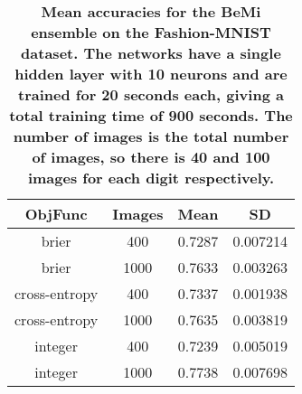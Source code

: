 \begin{center}
\begin{table}[!tb]
\centering
\begin{tabular}{|c|c|c|c|}
  \hline
ObjFunc & Images & Mean & SD \\ 
  \hline
brier & 400 & 0.7287 & 0.007214 \\ 
   \hline
brier & 1000 & 0.7633 & 0.003263 \\ 
   \hline
cross-entropy & 400 & 0.7337 & 0.001938 \\ 
   \hline
cross-entropy & 1000 & 0.7635 & 0.003819 \\ 
   \hline
integer & 400 & 0.7239 & 0.005019 \\ 
   \hline
integer & 1000 & 0.7738 & 0.007698 \\ 
   \hline
\end{tabular}
\caption{\small{\textbf{Mean accuracies for the BeMi ensemble on the Fashion-MNIST dataset. The networks
          have a single hidden layer with 10 neurons and are trained for 20 seconds each, giving a total
          training time of 900 seconds. The number of images is the total number of images, so there is
          40 and 100 images for each digit respectively.}}} 
\label{BEMI_OBJ_FMNIST}
\end{table}

\end{center}
